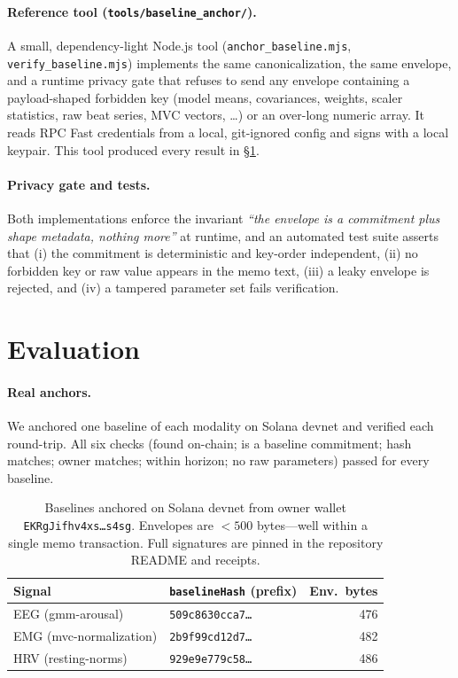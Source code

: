 \documentclass[10pt,twocolumn]{article}
\newcommand{\code}[1]{\texttt{\small #1}}
\begin{document}
\paragraph{Reference tool (\code{tools/baseline\_anchor/}).} A small,
dependency-light Node.js tool (\code{anchor\_baseline.mjs},
\code{verify\_baseline.mjs}) implements the same canonicalization, the same
envelope, and a runtime privacy gate that refuses to send any envelope
containing a payload-shaped forbidden key (model means, covariances, weights,
scaler statistics, raw beat series, MVC vectors, \ldots) or an over-long numeric
array. It reads RPC Fast credentials from a local, git-ignored config and signs
with a local keypair. This tool produced every result in \S\ref{sec:eval}.

\paragraph{Privacy gate and tests.} Both implementations enforce the invariant
\emph{``the envelope is a commitment plus shape metadata, nothing more''} at
runtime, and an automated test suite asserts that (i) the commitment is
deterministic and key-order independent, (ii) no forbidden key or raw value
appears in the memo text, (iii) a leaky envelope is rejected, and (iv) a
tampered parameter set fails verification.

\section{Evaluation}
\label{sec:eval}

\paragraph{Real anchors.} We anchored one baseline of each modality on Solana
devnet and verified each round-trip. All six checks
(found on-chain; is a baseline commitment; hash matches; owner matches; within
horizon; no raw parameters) passed for every baseline.

\begin{table}[h]
\centering
\footnotesize
\begin{tabular}{@{}llr@{}}
\toprule
Signal & \code{baselineHash} (prefix) & Env.\ bytes \\
\midrule
EEG (gmm-arousal)      & \code{509c8630cca7\ldots} & 476 \\
EMG (mvc-normalization)& \code{2b9f99cd12d7\ldots} & 482 \\
HRV (resting-norms)    & \code{929e9e779c58\ldots} & 486 \\
\bottomrule
\end{tabular}
\caption{Baselines anchored on Solana devnet from owner wallet
\code{EKRgJifhv4xs\ldots s4sg}. Envelopes are $<\!500$ bytes---well within a
single memo transaction. Full signatures are pinned in the repository README and
receipts.}
\label{tab:anchors}
\end{table}
\end{document}

